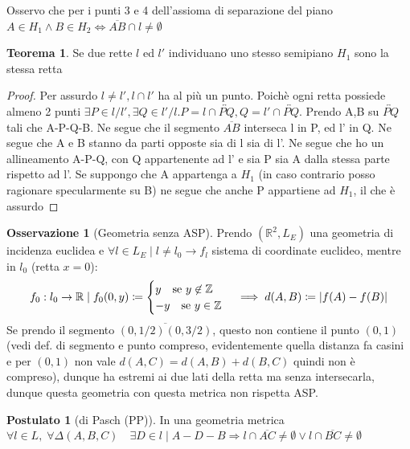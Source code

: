 \documentclass[a4paper,10pt]{article}
\theoremstyle{definition}
\newcommand{\re}{\mathbb{R}} %
\theoremstyle{indentdefinition}
\theoremstyle{indentpostulate}
\newtheorem{post}{Postulato}[section]
\theoremstyle{indenttheorem}
\newtheorem{thm}{Teorema}[section]
\theoremstyle{myremark}
\newtheorem*{rem*}{Osservazione}
\theoremstyle{indentgeneral}
\begin{document}
Osservo che per i punti 3 e 4 dell'assioma di separazione del piano $A \in H_1\land B \in H_2 \iff \overline{AB} \cap l \neq \emptyset$

\begin{thm}   Se due rette $l$ ed $l'$ individuano uno stesso semipiano $H_1$ sono la stessa retta   \end{thm} 

\begin{proof}    Per assurdo $l \neq l', l \cap l'$ ha al più un punto. Poichè ogni retta possiede almeno 2 punti $\exists P \in l/l', \exists Q \in l'/l. P=l \cap \overleftrightarrow{PQ}, Q=l' \cap \overleftrightarrow{PQ}.$ Prendo A,B su $\overleftrightarrow{PQ}$ tali che A-P-Q-B. Ne segue che il segmento $\overline{AB}$ interseca l in P, ed l' in Q. Ne segue che A e B stanno da parti opposte sia di l sia di l'. Ne segue che ho un allineamento A-P-Q, con Q appartenente ad l' e sia P sia A dalla stessa parte rispetto ad l'. Se suppongo che A appartenga a $H_1$ (in caso contrario posso ragionare specularmente su B) ne segue che anche P appartiene ad $H_1$, il che è assurdo  \end{proof} 


\begin{rem*}[Geometria senza ASP]
Prendo $(\re^2,L_E)$ una geometria di incidenza euclidea e $\forall l\in L_E\mid l\ne l_0\rightarrow f_l$ sistema di coordinate euclideo, mentre in $l_0$ (retta $x=0$):
$$f_0:l_0\to\re\mid f_0(0,y)\coloneqq
\begin{cases}
    y\quad \text{se }y \not \in \mathbb{Z} \\
    -y\quad \text{se }y\in\mathbb{Z}
\end{cases}\implies d(A,B)\coloneqq\abs{f(A)-f(B)}$$  
    Se prendo il segmento $\overline{(0,1/2)(0,3/2)}$, questo non contiene il punto $(0,1)$ (vedi def. di segmento e punto compreso, evidentemente quella distanza fa casini e per $(0,1)$ non vale $d(A,C)=d(A,B)+d(B,C)$ quindi non è compreso), dunque ha estremi ai due lati della retta ma senza intersecarla, dunque questa geometria con questa metrica non rispetta ASP.
\end{rem*} 

\begin{post}[di Pasch (PP)]\label{axm-pp}
    In una geometria metrica $\forall l \in L,\; \forall \Delta (A,B,C) \quad\exists D \in l \mid A-D-B \Rightarrow l \cap \overline{AC} \neq \emptyset \lor l \cap \overline{BC} \neq \emptyset$
\end{post}
\end{document}
